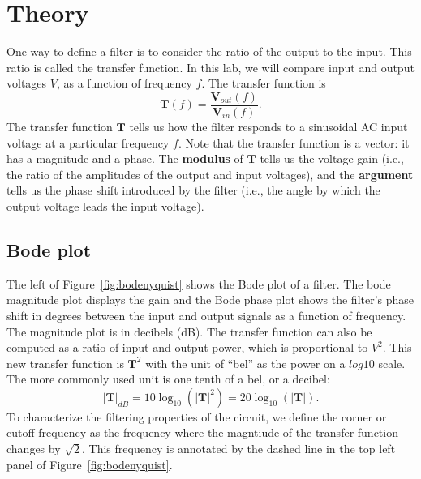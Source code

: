 \documentclass{article}
\begin{document}
\section*{Theory}
One way to define a filter is to consider the ratio of the output to
the input. This ratio is called the transfer function. In this lab, we
will compare input and output voltages $V$, as a function of frequency
$f$. The transfer function is 
\begin{equation}
  \mathbf{T}(f)=\frac{\mathbf{V}_{out}(f)}{\mathbf{V}_{in}(f)}.
\end{equation}
The transfer function $\mathbf{T}$ tells us how the filter responds to
a sinusoidal AC input voltage at a particular frequency $f$. Note that
the transfer function is a vector: it has a magnitude and a phase. The
\textbf{modulus} of $\mathbf{T}$ tells us the voltage gain (i.e., the
ratio of the amplitudes of the output and input voltages), and the
\textbf{argument} tells us the phase shift introduced by the filter
(i.e., the angle by which the output voltage leads the input voltage).

\subsection*{Bode plot}
The left of Figure~\ref{fig:bodenyquist} shows the Bode plot of a
filter. The bode magnitude plot displays the gain and the Bode phase
plot shows the filter's phase shift in degrees between the input and
output signals as a function of frequency. The magnitude plot is in
decibels (dB).  The transfer function can also be computed as a ratio
of input and output power, which is proportional to $V^2$. This new
transfer function is $\mathbf{T}^2$ with the unit of ``bel'' as the
power on a $log10$ scale. The more commonly used unit is one tenth of
a bel, or a decibel:
\begin{equation}
  |\mathbf{T}|_{dB}=
  10\log_{10}\left(|\mathbf{T}|^2\right) = 20\log_{10}(|\mathbf{T}|).
\end{equation}
To characterize the filtering properties of the circuit, we define the
corner or cutoff frequency as the frequency where the magntiude of the
transfer function changes by $\sqrt{2}$. This frequency is annotated
by the dashed line in the top left panel of
Figure~\ref{fig:bodenyquist}.
\end{document}
